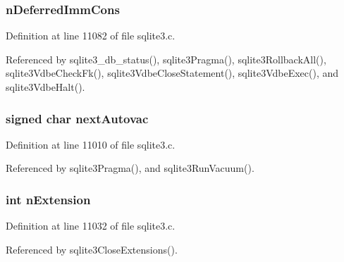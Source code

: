 \hypertarget{structsqlite3_a786ba95eeafb385b1bd53e180a79ed20}{}
\subsubsection[{n\+Deferred\+Imm\+Cons}]{ n\+Deferred\+Imm\+Cons}\label{structsqlite3_a786ba95eeafb385b1bd53e180a79ed20}


Definition at line 11082 of file sqlite3.\+c.



Referenced by sqlite3\+\_\+db\+\_\+status(), sqlite3\+Pragma(), sqlite3\+Rollback\+All(), sqlite3\+Vdbe\+Check\+Fk(), sqlite3\+Vdbe\+Close\+Statement(), sqlite3\+Vdbe\+Exec(), and sqlite3\+Vdbe\+Halt().

\hypertarget{structsqlite3_a94661adf68690fc28d4d81fc76375ca0}{}
\subsubsection[{next\+Autovac}]{\setlength{\rightskip}{0pt plus 5cm}signed char next\+Autovac}\label{structsqlite3_a94661adf68690fc28d4d81fc76375ca0}


Definition at line 11010 of file sqlite3.\+c.



Referenced by sqlite3\+Pragma(), and sqlite3\+Run\+Vacuum().

\hypertarget{structsqlite3_adf858352fa6409a229d7d409b46d06ce}{}
\subsubsection[{n\+Extension}]{\setlength{\rightskip}{0pt plus 5cm}int n\+Extension}\label{structsqlite3_adf858352fa6409a229d7d409b46d06ce}


Definition at line 11032 of file sqlite3.\+c.



Referenced by sqlite3\+Close\+Extensions().

\hypertarget{structsqlite3_adb50d6f96dfed28c834af4ae15a2a32a}{}
